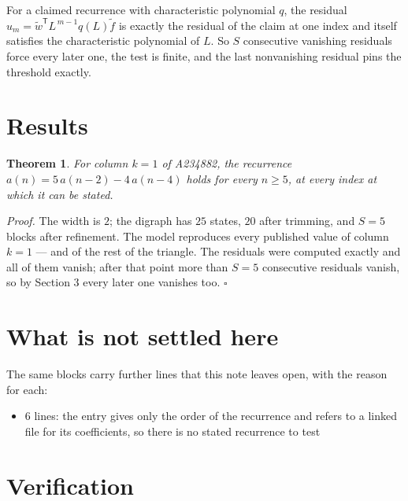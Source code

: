 \documentclass[11pt]{article}
\newtheorem{theorem}{Theorem}
\theoremstyle{definition}
\begin{document}
For a claimed recurrence with characteristic polynomial $q$, the residual $u_m = \tilde w^{\mathsf T}L^{\,m-1}q(L)\tilde f$ is exactly the residual of the claim at one index and itself satisfies the characteristic polynomial of $L$. So $S$ consecutive vanishing residuals force every later one, the test is finite, and the last nonvanishing residual pins the threshold exactly.

\section{Results}

\begin{theorem} For column $k = 1$ of A234882, the recurrence $a(n) = 5\,a(n-2) - 4\,a(n-4)$ holds for every $n \ge 5$, at every index at which it can be stated.\end{theorem}

{\itshape Proof.} The width is $2$; the digraph has $25$ states, $20$ after trimming, and $S = 5$ blocks after refinement. The model reproduces every published value of column $k = 1$ --- and of the rest of the triangle. The residuals were computed exactly and all of them vanish; after that point more than $S = 5$ consecutive residuals vanish, so by Section 3 every later one vanishes too. $\square$

\section{What is not settled here}

The same blocks carry further lines that this note leaves open, with the reason for each:

\begin{itemize}

\item 6 lines: the entry gives only the order of the recurrence and refers to a linked file for its coefficients, so there is no stated recurrence to test

\end{itemize}

\section{Verification}
\end{document}
